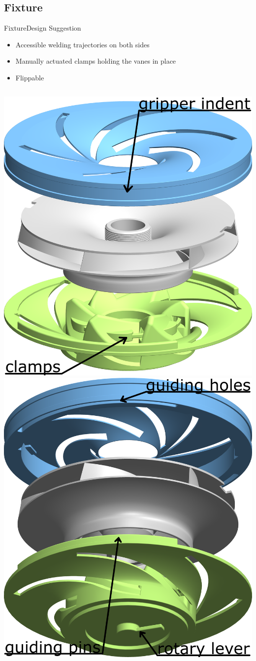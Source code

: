 \subsection{Fixture}
\begin{frame}{Fixture}{Design Suggestion}
\begin{itemize}
    \item Accessible welding trajectories on both sides
    \item Manually actuated clamps holding the vanes in place
    \item Flippable
\end{itemize}

\begin{columns}
  \centering
  \includegraphics[width=.85\textwidth]{graphics/andrej/if_top}
  \centering
    \includegraphics[width=.85\textwidth]{graphics/andrej/if_bottom}

\end{columns}
\end{frame}
